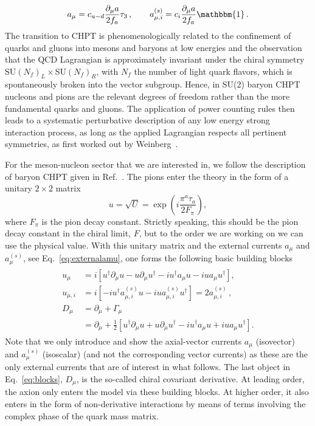 \documentclass[reprint,amssymb,amsmath,floatfix,aps,prd,groupedaddress,nofootinbib]{revtex4-2}
\begin{document}
\begin{equation}\label{eq:externalamu}
a_\mu = c_{u-d} \frac{\partial_\mu a}{2f_a} \tau_3\, , \qquad a_{\mu,i}^{(s)} = c_i \frac{\partial_\mu a}{2f_a} \mathbbm{1}\,.
\end{equation}
The transition to CHPT is phenomenologically related to the confinement of quarks and gluons into mesons and
baryons at low energies and the observation that the QCD Lagrangian is approximately invariant under the chiral symmetry SU$(N_f)_L\times$SU$(N_f)_R$, with $N_f$ the number of light quark flavors, which is spontaneously broken into the vector subgroup.
Hence, in SU(2) baryon CHPT nucleons and pions are the relevant degrees of freedom rather
than the more fundamental quarks and gluons. The application of power counting rules then leads to a
systematic perturbative description of any low energy strong interaction process, as long as the applied
Lagrangian respects all pertinent symmetries, as first worked out by Weinberg~\cite{Weinberg:1978kz}.

For the meson-nucleon sector that we are interested in, we follow the description of baryon CHPT given in Ref.~\cite{Bernard:1995dp}. The pions enter the theory in the form of a unitary $2\times 2$ matrix
\begin{equation}
u=\sqrt{U}=\exp\left(i\frac{\pi^a\tau_a}{2F_\pi}\right),
\end{equation}
where $F_\pi$ is the pion decay constant. Strictly speaking, this should be the pion decay constant in
the chiral limit, $F$, but to the order we are working on we can use the physical value.
With this unitary matrix and the external currents $a_\mu$ and $a_\mu^{(s)}$, see Eq.~\eqref{eq:externalamu},
one forms the following basic building blocks
\begin{align}
\begin{split}
u_\mu & = i\left[ u^\dagger \partial_\mu u - u \partial_\mu u^\dagger - i u^\dagger a_\mu u - i u a_\mu u^\dagger \right], \\
u_{\mu,i} & = i\left[ - i u^\dagger a_{\mu,i}^{(s)} u - i u a_{\mu,i}^{(s)} u^\dagger \right] = 2 a_{\mu,i}^{(s)}\,, \\
D_\mu & = \partial_\mu + \Gamma_\mu \\ &= \partial_\mu + \frac{1}{2} \left[ u^\dagger \partial_\mu u + u \partial_\mu u^\dagger
-i u^\dagger a_\mu u  + i u a_\mu u^\dagger \right]. 
\end{split}\label{eq:blocks}
\end{align}
Note that we only introduce and show the axial-vector currents $a_\mu$ (isovector) and $a_\mu^{(s)}$ (isoscalar)
(and not the corresponding vector currents) as these are the only external currents that are of interest
in what follows. The last object in Eq.~\eqref{eq:blocks}, $D_\mu$, is the so-called chiral covariant derivative.
At leading order, the axion only enters the model via these building blocks. At higher order, it also enters
in the form of non-derivative interactions by means of terms involving the complex phase of the quark mass matrix.
\end{document}
